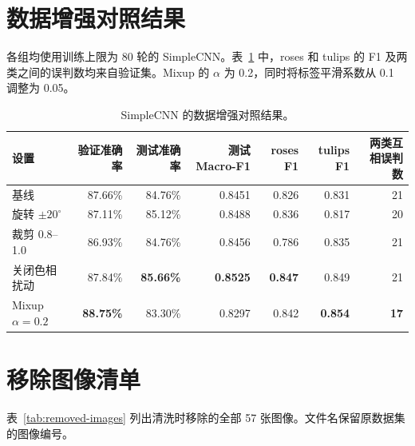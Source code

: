 \documentclass[11pt,a4paper,UTF8,fontset=windows]{ctexart}
\newcommand{\best}[1]{\textbf{#1}}
\begin{document}
\section{数据增强对照结果}
\label{app:aug}

各组均使用训练上限为 80 轮的 SimpleCNN。表~\ref{tab:aug} 中，roses 和 tulips 的 F1 及两类之间的误判数均来自验证集。Mixup 的 $\alpha$ 为 0.2，同时将标签平滑系数从 0.1 调整为 0.05。

\begin{table}[H]
\centering
\small
\caption{SimpleCNN 的数据增强对照结果。}
\label{tab:aug}
\begin{tabular}{lrrrrrr}
\toprule
设置 & 验证准确率 & 测试准确率 & 测试 Macro-F1 & roses F1 & tulips F1 & 两类互相误判数 \\
\midrule
基线                & 87.66\% & 84.76\% & 0.8451 & 0.826 & 0.831 & 21 \\
旋转 $\pm20^\circ$  & 87.11\% & 85.12\% & 0.8488 & 0.836 & 0.817 & 20 \\
裁剪 0.8--1.0       & 86.93\% & 84.76\% & 0.8456 & 0.786 & 0.835 & 21 \\
关闭色相扰动        & 87.84\% & \best{85.66\%} & \best{0.8525} & \best{0.847} & 0.849 & 21 \\
Mixup $\alpha=0.2$  & \best{88.75\%} & 83.30\% & 0.8297 & 0.842 & \best{0.854} & \best{17} \\
\bottomrule
\end{tabular}
\end{table}

\section{移除图像清单}
\label{app:removed-images}

表~\ref{tab:removed-images} 列出清洗时移除的全部 57 张图像。文件名保留原数据集的图像编号。
\end{document}

